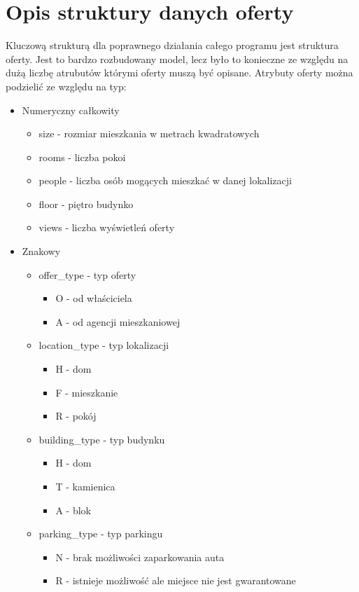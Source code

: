 \section{Opis struktury danych oferty}
\label{sec:strukturaOferty}
Kluczową strukturą dla poprawnego działania całego programu jest struktura oferty. Jest to bardzo rozbudowany model, lecz było to konieczne ze względu na dużą liczbę atrubutów którymi oferty muszą być opisane. Atrybuty oferty można podzielić ze względu na typ:
\begin{itemize}
\item Numeryczny całkowity
\begin{itemize}
\item size - rozmiar mieszkania w metrach kwadratowych
\item rooms - liczba pokoi
\item people - liczba osób mogących mieszkać w danej lokalizacji
\item floor - piętro budynko
\item views - liczba wyświetleń oferty
\end{itemize}
\item Znakowy
\begin{itemize}
\item offer\_type - typ oferty
\begin{itemize}
\item O - od właściciela
\item A - od agencji mieszkaniowej
\end{itemize}
\item location\_type - typ lokalizacji 
\begin{itemize}
\item H - dom
\item F - mieszkanie
\item R - pokój
\end{itemize}
\item building\_type - typ budynku
\begin{itemize}
\item H - dom
\item T - kamienica
\item A - blok
\end{itemize}
\item parking\_type - typ parkingu
\begin{itemize}
\item N - brak możliwości zaparkowania auta
\item R - istnieje możliwość ale miejsce nie jest gwarantowane

\end{itemize}
\end{itemize}
\end{itemize}
